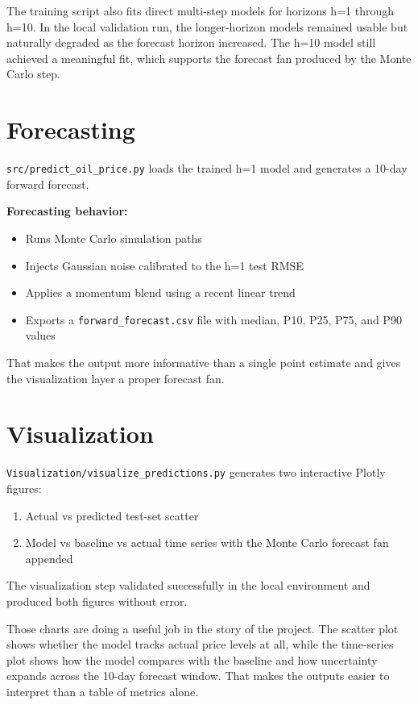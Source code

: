 \documentclass[conference]{IEEEtran}
\begin{document}
The training script also fits direct multi-step models for horizons h=1 through h=10. In the local validation run, the longer-horizon models remained usable but naturally degraded as the forecast horizon increased. The h=10 model still achieved a meaningful fit, which supports the forecast fan produced by the Monte Carlo step.

\section{Forecasting}

\texttt{src/predict\_oil\_price.py} loads the trained h=1 model and generates a 10-day forward forecast.

\textbf{Forecasting behavior:}
\begin{itemize}
  \item Runs Monte Carlo simulation paths
  \item Injects Gaussian noise calibrated to the h=1 test RMSE
  \item Applies a momentum blend using a recent linear trend
  \item Exports a \texttt{forward\_forecast.csv} file with median, P10, P25, P75, and P90 values
\end{itemize}

That makes the output more informative than a single point estimate and gives the visualization layer a proper forecast fan.

\section{Visualization}

\texttt{Visualization/visualize\_predictions.py} generates two interactive Plotly figures:

\begin{enumerate}
  \item Actual vs predicted test-set scatter
  \item Model vs baseline vs actual time series with the Monte Carlo forecast fan appended
\end{enumerate}

The visualization step validated successfully in the local environment and produced both figures without error.

Those charts are doing a useful job in the story of the project. The scatter plot shows whether the model tracks actual price levels at all, while the time-series plot shows how the model compares with the baseline and how uncertainty expands across the 10-day forecast window. That makes the outputs easier to interpret than a table of metrics alone.
\end{document}
